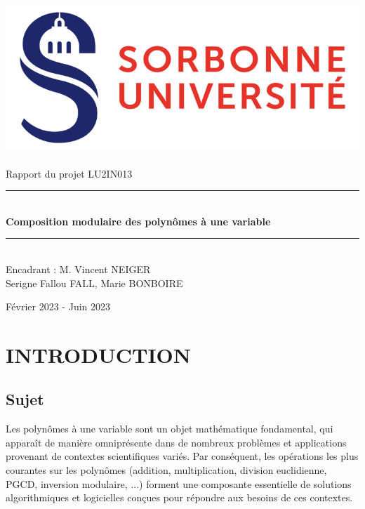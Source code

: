 \documentclass[a4paper]{article}
\begin{document}
\thispagestyle{plain}

\begin{titlepage}
    \begin{center}

        \bigskip
        \includegraphics[scale=0.5]{logo_su.jpg}~\\[4cm]

        {\LARGE Rapport du projet LU2IN013}\\[0.3cm]
        \rule{\linewidth}{0.5mm} \\[0.6cm]
        {\huge \textbf{Composition modulaire des polynômes à une variable}}\\[0.4cm]
        \rule{\linewidth}{0.5mm} \\[1cm]
        {\large Encadrant : M. Vincent NEIGER}\\[5cm]

        {\Large Serigne Fallou FALL, Marie BONBOIRE}
        
        \vfill
        Février 2023 - Juin 2023


    \end{center}
\end{titlepage}

\newpage

\tableofcontents

\newpage


\section{INTRODUCTION}

\subsection{Sujet}
Les polynômes à une variable sont un objet mathématique fondamental, qui
apparaît de manière omniprésente dans de nombreux problèmes et applications provenant
de contextes scientifiques variés. Par conséquent, les opérations les plus courantes sur les
polynômes (addition, multiplication, division euclidienne, PGCD, inversion
modulaire, ...) forment une composante essentielle de solutions algorithmiques et
logicielles conçues pour répondre aux besoins de ces contextes.
\end{document}

